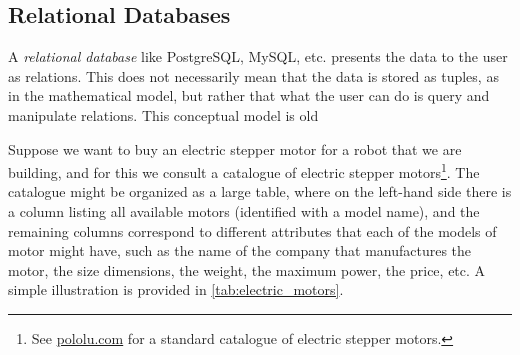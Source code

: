 \label{sec:specialization}


\subsection{Relational Databases}

A \emph{relational database} like PostgreSQL, MySQL, etc. presents 
the data to the user as relations. This does not necessarily mean
that the data is stored as tuples, as in the mathematical model, but 
rather that what the user can do is query and manipulate relations.
This conceptual model is old 


Suppose we want to buy an electric stepper motor for a robot that we are building, and for this we consult a catalogue of electric stepper motors\footnote{See \href{https://www.pololu.com/category/87/stepper-motors}{pololu.com} for a standard catalogue of electric stepper motors.}. The catalogue might be organized as a large table, where on the left-hand side there is a column listing all available motors (identified with a model name), and the remaining columns correspond to different attributes that each of the models of motor might have, such as the name of the company that manufactures the motor, the size dimensions, the weight, the maximum power, the price, etc. A simple illustration is provided in \cref{tab:electric_motors}.
\begin{table}[h]
    \centering
    \caption{A simplified catalogue of motors.}
    \label{tab:electric_motors}
\end{table}

